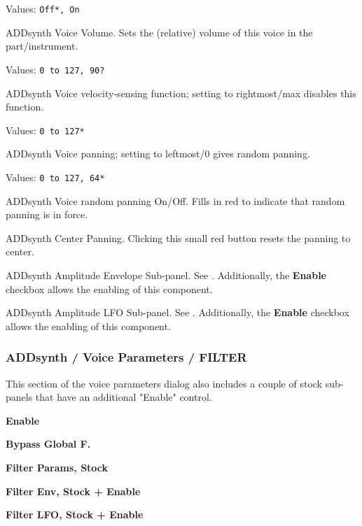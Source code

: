    Values: \texttt{Off*, On}

   ADDsynth Voice Volume.
   Sets the (relative) volume of this voice in the part/instrument.

   Values: \texttt{0 to 127, 90?}

   ADDsynth Voice velocity-sensing function; setting to rightmost/max
   disables this function.

   Values: \texttt{0 to 127*}

   ADDsynth Voice panning; setting to leftmost/0 gives random panning.

   Values: \texttt{0 to 127, 64*}

   ADDsynth Voice random panning On/Off.
   Fills in red to indicate that random panning is in force.

   ADDsynth Center Panning.
   Clicking this small red button resets the panning to center.

   ADDsynth Amplitude Envelope Sub-panel.
   See .
   Additionally, the \textbf{Enable} checkbox allows the enabling of this
   component.

   ADDsynth Amplitude LFO Sub-panel.
   See .
   Additionally, the \textbf{Enable} checkbox allows the enabling of this
   component.

\subsubsection{ADDsynth / Voice Parameters / FILTER}
\label{subsubsec:addsynth_voice_parameters_filter}

   This section of the voice parameters dialog also includes a couple of
   stock sub-panels that have an additional "Enable" control.

   \begin{enumber}
      \item \textbf{Enable}
      \item \textbf{Bypass Global F.}
      \item \textbf{Filter Params, Stock}
      \item \textbf{Filter Env, Stock + Enable}
      \item \textbf{Filter LFO, Stock + Enable}
   \end{enumber}

